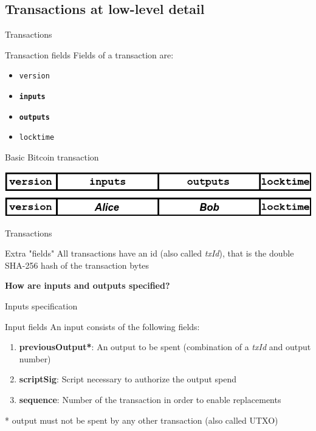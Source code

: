 \documentclass{beamer}
\begin{document}
\subsection{Transactions at low-level detail}
\begin{frame}{Transactions}
 \begin{block}{Transaction fields}
  Fields of a transaction are:
  \begin{itemize}
   \item \texttt{version}
   \item \textbf{\texttt{inputs}}
   \item \textbf{\texttt{outputs}}
   \item \texttt{locktime}
  \end{itemize}
 \end{block}
 \begin{exampleblock}{Basic Bitcoin transaction}
  \begin{center}
   \includegraphics[width=\textwidth, height=0.8\textheight, keepaspectratio]{img/basic_tx.png}
  \end{center}
 \end{exampleblock}
\end{frame}
\begin{frame}{Transactions}
 \begin{block}{Extra "fields"}
  All transactions have an id (also called \textit{txId}), that is the
  double SHA-256 hash of the transaction bytes
 \end{block}
\end{frame}
\begin{frame}
 \begin{center}
  \textbf{How are inputs and outputs specified?}
 \end{center}
\end{frame}
\begin{frame}{Inputs specification}
 \begin{block}{Input fields}
  An input consists of the following fields:
  \begin{enumerate}
   \item \textbf{previousOutput*}: An output to be spent (combination of a \textit{txId} and output number)
   \item \textbf{scriptSig}: Script necessary to authorize the output spend
   \item \textbf{sequence}: Number of the transaction in order to enable replacements
  \end{enumerate}
  * output must not be spent by any other transaction (also called UTXO)
 \end{block}
\end{frame}
\end{document}

